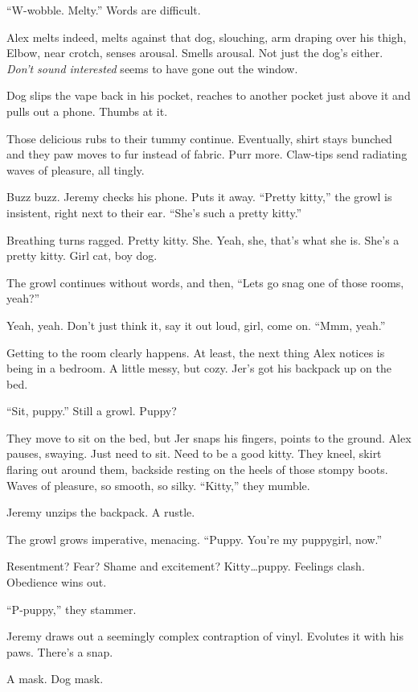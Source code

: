 \documentclass[12pt,letterpaper,oneside]{memoir}
\begin{document}
  ``W-wobble. Melty.'' Words are difficult.

  Alex melts indeed, melts against that dog, slouching, arm draping over
  his thigh, Elbow, near crotch, senses arousal. Smells arousal. Not just
  the dog's either. \emph{Don't sound interested} seems to have gone out
  the window.

  Dog slips the vape back in his pocket, reaches to another pocket just
  above it and pulls out a phone. Thumbs at it.

  Those delicious rubs to their tummy continue. Eventually, shirt stays
  bunched and they paw moves to fur instead of fabric. Purr more.
  Claw-tips send radiating waves of pleasure, all tingly.

  Buzz buzz. Jeremy checks his phone. Puts it away. ``Pretty kitty,'' the
  growl is insistent, right next to their ear. ``She's such a pretty
  kitty.''

  Breathing turns ragged. Pretty kitty. She. Yeah, she, that's what she
  is. She's a pretty kitty. Girl cat, boy dog.

  The growl continues without words, and then, ``Lets go snag one of those
  rooms, yeah?''

  Yeah, yeah. Don't just think it, say it out loud, girl, come on. ``Mmm,
  yeah.''

  Getting to the room clearly happens. At least, the next thing Alex
  notices is being in a bedroom. A little messy, but cozy. Jer's got his
  backpack up on the bed.

  ``Sit, puppy.'' Still a growl. Puppy?

  They move to sit on the bed, but Jer snaps his fingers, points to the
  ground. Alex pauses, swaying. Just need to sit. Need to be a good kitty.
  They kneel, skirt flaring out around them, backside resting on the heels
  of those stompy boots. Waves of pleasure, so smooth, so silky.
  ``Kitty,'' they mumble.

  Jeremy unzips the backpack. A rustle.

  The growl grows imperative, menacing. ``Puppy. You're my puppygirl,
  now.''

  Resentment? Fear? Shame and excitement? Kitty\ldots{}puppy. Feelings
  clash. Obedience wins out.

  ``P-puppy,'' they stammer.

  Jeremy draws out a seemingly complex contraption of vinyl. Evolutes it
  with his paws. There's a snap.

  A mask. Dog mask.
\end{document}
